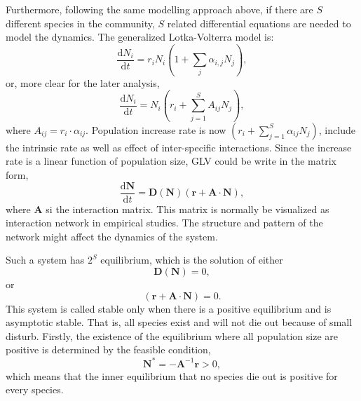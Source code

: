     Furthermore, following the same modelling approach above, if there are $S$ different species in the community, $S$ related differential equations are needed to model the dynamics. The generalized Lotka-Volterra model is:
    \begin{equation*}
        \frac{\mathrm{d}N_i}{\mathrm{d}t}
        = r_i N_i \left( 1 + \sum_{j} \alpha_{i,j} N_j \right),
    \end{equation*}
    or, more clear for the later analysis,
    \begin{equation}\label{A:eqn:L-V_equation}
        \frac{\mathrm{d} N_i}{\mathrm{d} t} = N_i \left( r_i + \sum_{j=1}^{S} A_{ij} N_j \right),
    \end{equation}
    where $A_{ij} = r_i \cdot \alpha_{ij}$. Population increase rate is now $\left( r_i + \sum_{j=1}^{S} \alpha_{ij} N_j \right)$, include the intrinsic rate as well as effect of inter-specific interactions. Since the increase rate is a linear function of population size, GLV could be write in the matrix form,
    \begin{equation}\label{eqn:L-V_equation_matrix}
        \frac{\mathrm{d} \boldsymbol{N}}{\mathrm{d} t} = \boldsymbol{D}(\boldsymbol{N}) \left( \boldsymbol{r} + \boldsymbol{A} \cdot \boldsymbol{N} \right),
    \end{equation}
    where $\boldsymbol{A}$ si the interaction matrix. This matrix is normally be visualized as interaction network in empirical studies. The structure and pattern of the network might affect the dynamics of the system.

    Such a system has $2^S$ equilibrium, which is the solution of either
    \begin{equation*}
        \boldsymbol{D}(\boldsymbol{N}) = 0,
    \end{equation*}
    or
    \begin{equation*}
        \left( \boldsymbol{r} + \boldsymbol{A} \cdot \boldsymbol{N} \right) = 0.
    \end{equation*}
    This system is called stable only when there is a positive equilibrium and is asymptotic stable. That is, all species exist and will not die out because of small disturb. Firstly, the existence of the equilibrium where all population size are positive is determined by the feasible condition, 
    \begin{equation}
        \boldsymbol{N}^* = -\boldsymbol{A}^{-1}\boldsymbol{r} > 0,
    \end{equation}
    which means that the inner equilibrium that no species die out is positive for every species.

